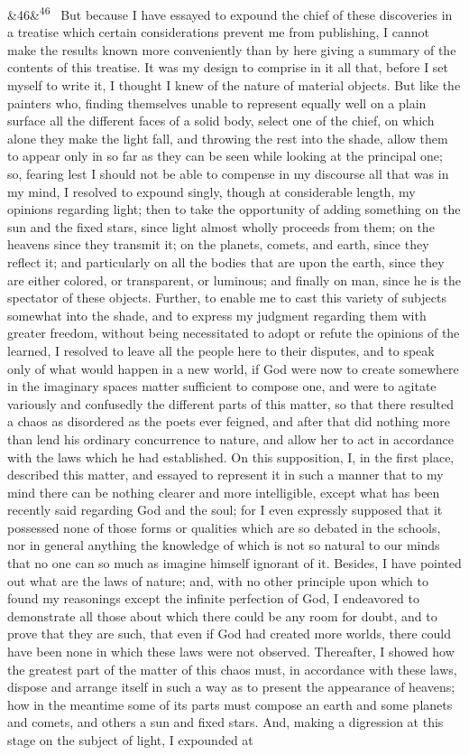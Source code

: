 \documentclass[12pt]{article}
\newcommand{\para}[1][]{\par\noindent\ifx&#1&\else\textsuperscript{\footnotesize #1}~\fi}
\begin{document}
\para[46] But because I have essayed to expound the chief of these discoveries in a treatise which certain considerations prevent me from publishing, I cannot make the results known more conveniently than by here giving a summary of the contents of this treatise. It was my design to comprise in it all that, before I set myself to write it, I thought I knew of the nature of material objects. But like the painters who, finding themselves unable to represent equally well on a plain surface all the different faces of a solid body, select one of the chief, on which alone they make the light fall, and throwing the rest into the shade, allow them to appear only in so far as they can be seen while looking at the principal one; so, fearing lest I should not be able to compense in my discourse all that was in my mind, I resolved to expound singly, though at considerable length, my opinions regarding light; then to take the opportunity of adding something on the sun and the fixed stars, since light almost wholly proceeds from them; on the heavens since they transmit it; on the planets, comets, and earth, since they reflect it; and particularly on all the bodies that are upon the earth, since they are either colored, or transparent, or luminous; and finally on man, since he is the spectator of these objects. Further, to enable me to cast this variety of subjects somewhat into the shade, and to express my judgment regarding them with greater freedom, without being necessitated to adopt or refute the opinions of the learned, I resolved to leave all the people here to their disputes, and to speak only of what would happen in a new world, if God were now to create somewhere in the imaginary spaces matter sufficient to compose one, and were to agitate variously and confusedly the different parts of this matter, so that there resulted a chaos as disordered as the poets ever feigned, and after that did nothing more than lend his ordinary concurrence to nature, and allow her to act in accordance with the laws which he had established. On this supposition, I, in the first place, described this matter, and essayed to represent it in such a manner that to my mind there can be nothing clearer and more intelligible, except what has been recently said regarding God and the soul; for I even expressly supposed that it possessed none of those forms or qualities which are so debated in the schools, nor in general anything the knowledge of which is not so natural to our minds that no one can so much as imagine himself ignorant of it. Besides, I have pointed out what are the laws of nature; and, with no other principle upon which to found my reasonings except the infinite perfection of God, I endeavored to demonstrate all those about which there could be any room for doubt, and to prove that they are such, that even if God had created more worlds, there could have been none in which these laws were not observed. Thereafter, I showed how the greatest part of the matter of this chaos must, in accordance with these laws, dispose and arrange itself in such a way as to present the appearance of heavens; how in the meantime some of its parts must compose an earth and some planets and comets, and others a sun and fixed stars. And, making a digression at this stage on the subject of light, I expounded at 
\end{document}
